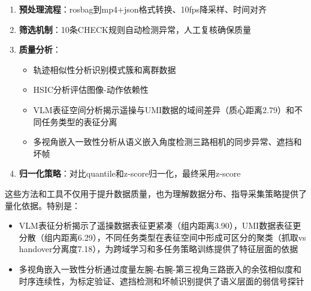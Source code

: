 \begin{enumerate}[leftmargin=2em]
    \item \textbf{预处理流程}：rosbag到mp4+json格式转换、10fps降采样、时间对齐
    \item \textbf{筛选机制}：10条CHECK规则自动检测异常，人工复核确保质量
    \item \textbf{质量分析}：
    \begin{itemize}
        \item 轨迹相似性分析识别模式簇和离群数据
        \item HSIC分析评估图像-动作依赖性
        \item VLM表征空间分析揭示遥操与UMI数据的域间差异（质心距离2.79）和不同任务类型的表征分离
        \item 多视角嵌入一致性分析从语义嵌入角度检测三路相机的同步异常、遮挡和坏帧
    \end{itemize}
    \item \textbf{归一化策略}：对比quantile和z-score归一化，最终采用z-score
\end{enumerate}

这些方法和工具不仅用于提升数据质量，也为理解数据分布、指导采集策略提供了量化依据。特别是：
\begin{itemize}[leftmargin=2em]
    \item VLM表征分析揭示了遥操数据表征更紧凑（组内距离3.90），UMI数据表征更分散（组内距离6.29），不同任务类型在表征空间中形成可区分的聚类（抓取vs handover分离度7.18），为跨域学习和多任务策略训练提供了特征层面的依据
    \item 多视角嵌入一致性分析通过度量左腕-右腕-第三视角三路嵌入的余弦相似度和时序连续性，为标定验证、遮挡检测和坏帧识别提供了语义层面的弱信号探针
\end{itemize}


